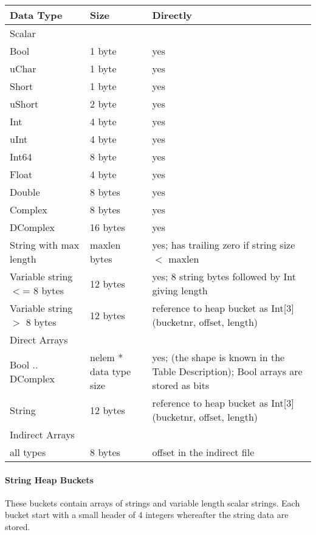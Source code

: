 \vspace{0.15in}
\begin{tabular}{|l|l|l|} \hline
  Data Type & Size & Directly \\ \hline\hline
  Scalar &  & \\ \hline
  Bool & 1 byte & yes \\
  uChar & 1 byte & yes \\
  Short & 1 byte & yes \\
  uShort & 2 byte & yes \\
  Int & 4 byte & yes \\
  uInt & 4 byte & yes \\
  Int64 & 8 byte & yes \\
  Float & 4 byte & yes \\
  Double & 8 bytes & yes \\
  Complex & 8 bytes & yes \\
  DComplex & 16 bytes & yes \\
  String with max length & maxlen bytes & yes; has trailing zero if string size $<$ maxlen \\
  Variable string $<$= 8 bytes & 12 bytes & yes; 8 string bytes followed by Int giving length \\
  Variable string $>$ 8 bytes & 12 bytes & reference to heap bucket as Int[3] (bucketnr, offset, length) \\
  \hline  
Direct Arrays &  & \\ \hline
  Bool .. DComplex & nelem * data type size & yes; (the shape is known in the Table Description);
Bool arrays are stored as bits \\
  String & 12 bytes & reference to heap bucket as Int[3] (bucketnr, offset, length) \\
  \hline  
Indirect Arrays &  & \\ \hline
  all types & 8 bytes & offset in the indirect file \\
  \hline
\end{tabular}
\vspace{0.15in}

\paragraph{String Heap Buckets\\}
These buckets contain arrays of strings and variable length scalar strings.
Each bucket start with a small header of 4 integers whereafter the
string data are stored.


